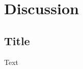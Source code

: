 
\chapter{Discussion}  %

\ifpdf
    \graphicspath{{Chapters/Chapter5/Figs/Raster/}{Chapters/Chapter5/Figs/PDF/}{Chapters/Chapter5/Figs/}}
\else
    \graphicspath{{Chapters/Chapter5/Figs/Vector/}{Chapters/Chapter5/Figs/}}
\fi


\section{Title}
Text